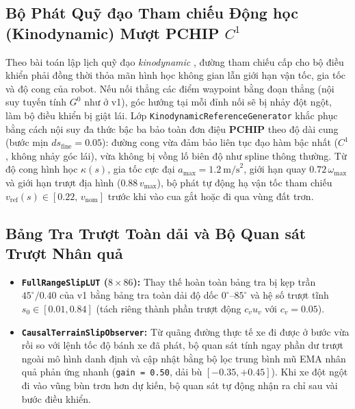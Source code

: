 \documentclass[12pt, a4paper]{article}
\begin{document}
\subsection{\texorpdfstring{Bộ Phát Quỹ đạo Tham chiếu Động học (Kinodynamic) Mượt PCHIP $C^1$}{Bộ Phát Quỹ đạo Tham chiếu Động học (Kinodynamic) Mượt PCHIP C1}}
Theo bài toán lập lịch quỹ đạo \textit{kinodynamic} \cite{donald1993kinodynamic}, đường tham chiếu cấp cho bộ điều khiển phải đồng thời thỏa mãn hình học không gian lẫn giới hạn vận tốc, gia tốc và độ cong của robot. Nếu nối thẳng các điểm waypoint bằng đoạn thẳng (nội suy tuyến tính $G^0$ như ở v1), góc hướng tại mỗi đỉnh nối sẽ bị nhảy đột ngột, làm bộ điều khiển bị giật lái. Lớp \texttt{KinodynamicReferenceGenerator} khắc phục bằng cách nội suy đa thức bậc ba bảo toàn đơn điệu \textbf{PCHIP} \cite{fritsch1980} theo độ dài cung (bước mịn $ds_{\text{fine}} = 0.05$): đường cong vừa đảm bảo liên tục đạo hàm bậc nhất ($C^1$, không nhảy góc lái), vừa không bị vồng lố biên độ như spline thông thường. Từ độ cong hình học $\kappa(s)$, gia tốc cực đại $a_{\max} = 1.2\ \text{m/s}^2$, giới hạn quay $0.72\,\omega_{\max}$ và giới hạn trượt địa hình ($0.88\,v_{\max}$), bộ phát tự động hạ vận tốc tham chiếu $v_{\text{ref}}(s) \in [0.22,\, v_{\text{nom}}]$ trước khi vào cua gắt hoặc đi qua vùng đất trơn.

\subsection{Bảng Tra Trượt Toàn dải và Bộ Quan sát Trượt Nhân quả}
\begin{itemize}
    \item \textbf{\texttt{FullRangeSlipLUT} ($8 \times 86$):} Thay thế hoàn toàn bảng tra bị kẹp trần $45^\circ / 0.40$ của v1 bằng bảng tra toàn dải độ dốc $0^\circ\text{--}85^\circ$ và hệ số trượt tĩnh $s_0 \in [0.01, 0.84]$ (tách riêng thành phần trượt động $c_v u_v$ với $c_v = 0.05$).
    \item \textbf{\texttt{CausalTerrainSlipObserver}:} Từ quãng đường thực tế xe đi được ở bước vừa rồi so với lệnh tốc độ bánh xe đã phát, bộ quan sát tính ngay phần dư trượt ngoài mô hình danh định và cập nhật bằng bộ lọc trung bình mũ EMA nhân quả phản ứng nhanh (\texttt{gain = 0.50}, dải bù $[-0.35, +0.45]$). Khi xe đột ngột đi vào vũng bùn trơn hơn dự kiến, bộ quan sát tự động nhận ra chỉ sau vài bước điều khiển.
\end{itemize}
\end{document}
